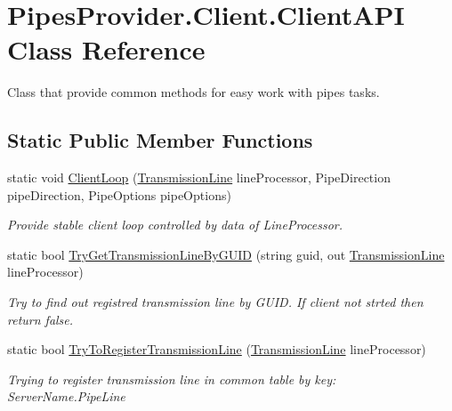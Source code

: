 \hypertarget{class_pipes_provider_1_1_client_1_1_client_a_p_i}{}\section{Pipes\+Provider.\+Client.\+Client\+A\+PI Class Reference}
\label{class_pipes_provider_1_1_client_1_1_client_a_p_i}


Class that provide common methods for easy work with pipes\textquotesingle{} tasks.  


\subsection*{Static Public Member Functions}
\begin{DoxyCompactItemize}
\item 
static void \mbox{\hyperlink{class_pipes_provider_1_1_client_1_1_client_a_p_i_a8031df7ac05189a2459a110273c6fc37}{Client\+Loop}} (\mbox{\hyperlink{class_pipes_provider_1_1_client_1_1_transmission_line}{Transmission\+Line}} line\+Processor, Pipe\+Direction pipe\+Direction, Pipe\+Options pipe\+Options)
\begin{DoxyCompactList}\small\item\em Provide stable client loop controlled by data of Line\+Processor. \end{DoxyCompactList}\item 
static bool \mbox{\hyperlink{class_pipes_provider_1_1_client_1_1_client_a_p_i_a745ac6dce4a89785c4b9306af84871e7}{Try\+Get\+Transmission\+Line\+By\+G\+U\+ID}} (string guid, out \mbox{\hyperlink{class_pipes_provider_1_1_client_1_1_transmission_line}{Transmission\+Line}} line\+Processor)
\begin{DoxyCompactList}\small\item\em Try to find out registred transmission line by G\+U\+ID. If client not strted then return false. \end{DoxyCompactList}\item 
static bool \mbox{\hyperlink{class_pipes_provider_1_1_client_1_1_client_a_p_i_a70ffe69963e762ee828887856e119883}{Try\+To\+Register\+Transmission\+Line}} (\mbox{\hyperlink{class_pipes_provider_1_1_client_1_1_transmission_line}{Transmission\+Line}} line\+Processor)
\begin{DoxyCompactList}\small\item\em Trying to register transmission line in common table by key\+: Server\+Name.\+Pipe\+Line \end{DoxyCompactList}\item 

\end{DoxyCompactItemize}
